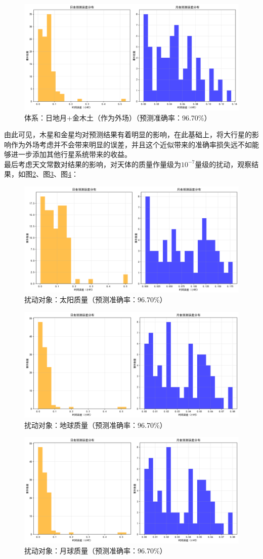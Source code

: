 \documentclass[hidelinks]{article}
\begin{document}
\begin{figure}[H]
    \centering
    \includegraphics[width=0.5\linewidth]{images/error_distribution_semjvs_aux.png}
    \caption{体系：日地月+金木土（作为外场）（预测准确率：96.70\%）}
    \label{fig:eclipse_error_semjvs_aux}
\end{figure}

由此可见，木星和金星均对预测结果有着明显的影响，在此基础上，将大行星的影响作为外场考虑并不会带来明显的误差，并且这个近似带来的准确率损失远不如能够进一步添加其他行星系统带来的收益。\\
最后考虑天文常数对结果的影响，对天体的质量作量级为$10^{-7}$量级的扰动，观察结果，如图\ref{fig:eclipse_error_sun}、图\ref{fig:eclipse_error_earth}、图\ref{fig:eclipse_error_moon}：
\begin{figure}[h]
    \centering
    \includegraphics[width=0.5\linewidth]{images/error_distribution_sun.png}
    \caption{扰动对象：太阳质量（预测准确率：96.70\%）}
    \label{fig:eclipse_error_sun}
\end{figure}

\begin{figure}[H]
    \centering
    \includegraphics[width=0.5\linewidth]{images/error_distribution_earth.png}
    \caption{扰动对象：地球质量（预测准确率：96.70\%）}
    \label{fig:eclipse_error_earth}
\end{figure}

\begin{figure}[H]
    \centering
    \includegraphics[width=0.5\linewidth]{images/error_distribution_earth.png}
    \caption{扰动对象：月球质量（预测准确率：96.70\%）}
    \label{fig:eclipse_error_moon}
\end{figure}
\end{document}

